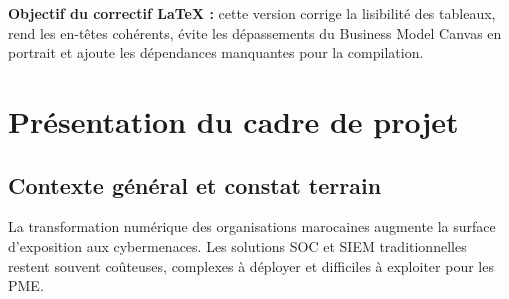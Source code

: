 \documentclass[11pt,a4paper]{report}
\begin{document}
\begin{infobox}
\textbf{Objectif du correctif LaTeX :} cette version corrige la lisibilité des tableaux, rend les en-têtes cohérents, évite les dépassements du Business Model Canvas en portrait et ajoute les dépendances manquantes pour la compilation.
\end{infobox}

\tableofcontents
\listoffigures
\listoftables

\chapter{Présentation du cadre de projet}

\section{Contexte général et constat terrain}

La transformation numérique des organisations marocaines augmente la surface d'exposition aux cybermenaces. Les solutions SOC et SIEM traditionnelles restent souvent coûteuses, complexes à déployer et difficiles à exploiter pour les PME.
\end{document}
